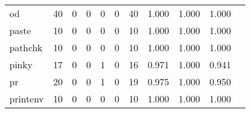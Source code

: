 \begin{longtable}{lp{1.2cm}p{1.2cm}p{1.2cm}p{1.2cm}p{1.2cm}p{1.2cm}p{1.2cm}p{1.2cm}p{1.2cm}p{1.2cm}}
od        &                                    40 &                                                  0 &                                                  0 &                                                  0 &                                                  0 &                                                 40 &                                              1.000 &                                              1.000 &                                              1.000 \\
paste     &                                    10 &                                                  0 &                                                  0 &                                                  0 &                                                  0 &                                                 10 &                                              1.000 &                                              1.000 &                                              1.000 \\
pathchk   &                                    10 &                                                  0 &                                                  0 &                                                  0 &                                                  0 &                                                 10 &                                              1.000 &                                              1.000 &                                              1.000 \\
pinky     &                                    17 &                                                  0 &                                                  0 &                                                  1 &                                                  0 &                                                 16 &                                              0.971 &                                              1.000 &                                              0.941 \\
pr        &                                    20 &                                                  0 &                                                  0 &                                                  1 &                                                  0 &                                                 19 &                                              0.975 &                                              1.000 &                                              0.950 \\
printenv  &                                    10 &                                                  0 &                                                  0 &                                                  0 &                                                  0 &                                                 10 &                                              1.000 &                                              1.000 &                                              1.000 \\

\end{longtable}
